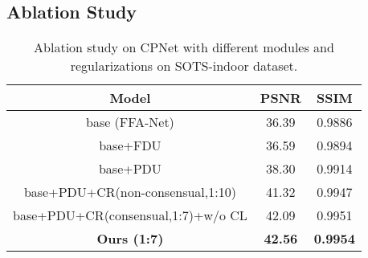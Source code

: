 \vspace{-2mm}\subsection{Ablation Study}\vspace{-2mm}
\begin{table}[t]
	\caption{Ablation study on CPNet with different modules and regularizations on SOTS-indoor dataset.}
	\centering
	\small
	\begin{tabular}{c||c|c}
		\toprule
		Model&PSNR&SSIM\\	
		\midrule
		base (FFA-Net) &36.39&0.9886\\
		
		base+FDU&36.59&0.9894\\
		
		base+PDU  &38.30&0.9914\\		
		
		base+PDU+CR(non-consensual,1:10)  &41.32&0.9947\\	
		
		base+PDU+CR(consensual,1:7)+w/o CL  &42.09&0.9951\\		
		\midrule
		\textbf{Ours (1:7)} &\textbf{42.56}&\textbf{0.9954}\\
		\bottomrule
	\end{tabular}\vspace{-5mm}
	\label{tab:ablation}
\end{table}

